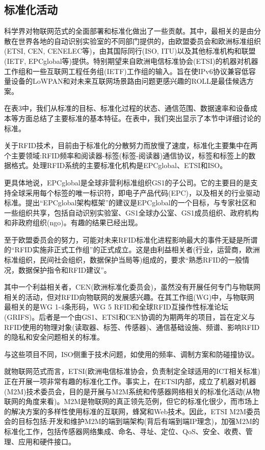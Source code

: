 \documentclass[12pt,a4paper]{article}%
\begin{document}
\subsection{标准化活动}
科学界对物联网范式的全面部署和标准化做出了一些贡献。其中，最相关的是由分散在世界各地的自动识别实验室的不同部门提供的，由欧盟委员会和欧洲标准组织(ETSI, CEN, CENELEC等)，由其国际同行(ISO, ITU)以及其他标准机构和联盟(IETF, EPCglobal等)提供。特别期望来自欧洲电信标准协会(ETSI)的机器对机器工作组和一些互联网工程任务组(IETF)工作组的输入。旨在使IPv6协议兼容低容量设备的LoWPAN和对未来互联网场景路由问题更感兴趣的ROLL是最佳候选方案。

在表3中，我们从标准的目标、标准化过程的状态、通信范围、数据速率和设备成本等方面总结了主要标准的基本特征。在表中，我们突出显示了本节中详细讨论的标准。

关于RFID技术，目前由于标准化的分散努力而放慢了速度，标准化主要集中在两个主要领域:RFID频率和阅读器-标签(标签-阅读器)通信协议，标签和标签上的数据格式。处理RFID系统的主要标准化机构是EPCglobal、ETSI和ISO。

更具体地说，EPCglobal是全球非营利标准组织GS1的子公司。它的主要目的是支持全球采用每个标签的唯一标识符，即电子产品代码(EPC)，以及相关的行业驱动标准。提出“EPCglobal架构框架”的建议是EPCglobal的一个目标，与专家社区和一些组织共享，包括自动识别实验室、GS1全球办公室、GS1成员组织、政府机构和非政府组织(ngo)。有趣的结果已经出现。

至于欧盟委员会的努力，可能对未来RFID标准化进程影响最大的事件无疑是所谓的“RFID实施非正式工作组”的正式成立。这是由利益相关者(行业，运营商，欧洲标准组织，民间社会组织，数据保护当局等)组成的，要求“熟悉RFID的一般情况，数据保护指令和RFID建议”。

其中一个利益相关者，CEN(欧洲标准化委员会)，虽然没有开展任何专门与物联网相关的活动，但对RFID向物联网的发展感兴趣。在其工作组(WG)中，与物联网最相关的是WG 1-4条形码，WG 5 RFID和全球RFID互操作性标准论坛(GRIFS)。后者是一个由GS1、ETSI和CEN协调的为期两年的项目，旨在定义与RFID使用的物理对象(读取器、标签、传感器)、通信基础设施、频谱、影响RFID的隐私和安全问题相关的标准。

与这些项目不同，ISO侧重于技术问题，如使用的频率、调制方案和防碰撞协议。

就物联网范式而言，ETSI(欧洲电信标准协会，负责制定全球适用的ICT相关标准)正在开展一项非常有趣的标准化工作。事实上，在ETSI内部，成立了机器对机器(M2M)技术委员会，目的是开展与M2M系统和传感器网络相关的标准化活动(从物联网的角度来看)。M2M是物联网的真正领先范例，但它的标准化很少，而市场上的解决方案的多样性使用标准的互联网，蜂窝和Web技术。因此，ETSI M2M委员会的目标包括:开发和维护M2M的端到端架构(背后有端到端IP理念)，加强M2M的标准化工作，包括传感器网络集成、命名、寻址、定位、QoS、安全、收费、管理、应用和硬件接口。
\end{document}
